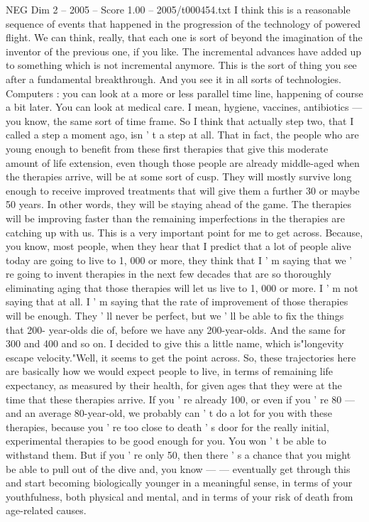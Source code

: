 \begin{textsample}{NEG Dim 2 – 2005 – Score 1.00 – 2005/t000454.txt}
I think this is a reasonable sequence of events that happened in the progression of the technology of powered flight.
We can think, really, that each one is sort of beyond the imagination of the inventor of the previous one, if you like.
The incremental advances have added up to something which is not incremental anymore.
This is the sort of thing you see after a fundamental breakthrough.
And you see it in all sorts of technologies.
Computers : you can look at a more or less parallel time line, happening of course a bit later.
You can look at medical care.
I mean, hygiene, vaccines, antibiotics — you know, the same sort of time frame.
So I think that actually step two, that I called a step a moment ago, isn ' t a step at all.
That in fact, the people who are young enough to benefit from these first therapies that give this moderate amount of life extension, even though those people are already middle-aged when the therapies arrive, will be at some sort of cusp.
They will mostly survive long enough to receive improved treatments that will give them a further 30 or maybe 50 years.
In other words, they will be staying ahead of the game.
The therapies will be improving faster than the remaining imperfections in the therapies are catching up with us.
This is a very important point for me to get across.
Because, you know, most people, when they hear that I predict that a lot of people alive today are going to live to 1, 000 or more, they think that I ' m saying that we ' re going to invent therapies in the next few decades that are so thoroughly eliminating aging that those therapies will let us live to 1, 000 or more.
I ' m not saying that at all.
I ' m saying that the rate of improvement of those therapies will be enough.
They ' ll never be perfect, but we ' ll be able to fix the things that 200- year-olds die of, before we have any 200-year-olds.
And the same for 300 and 400 and so on.
I decided to give this a little name, which is"longevity escape velocity."Well, it seems to get the point across.
So, these trajectories here are basically how we would expect people to live, in terms of remaining life expectancy, as measured by their health, for given ages that they were at the time that these therapies arrive.
If you ' re already 100, or even if you ' re 80 — and an average 80-year-old, we probably can ' t do a lot for you with these therapies, because you ' re too close to death ' s door for the really initial, experimental therapies to be good enough for you.
You won ' t be able to withstand them.
But if you ' re only 50, then there ' s a chance that you might be able to pull out of the dive and, you know — — eventually get through this and start becoming biologically younger in a meaningful sense, in terms of your youthfulness, both physical and mental, and in terms of your risk of death from age-related causes.

\end{textsample}
